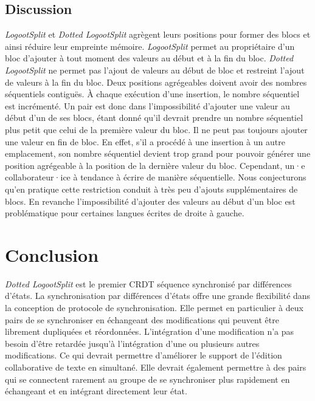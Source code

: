 \vspace*{\fill}
\clearpage

\subsection{Discussion}

\emph{LogootSplit} et \emph{Dotted LogootSplit} agrègent leurs positions pour former des blocs et ainsi réduire leur empreinte mémoire.
\emph{LogootSplit} permet au propriétaire d'un bloc d'ajouter à tout moment des valeurs au début et à la fin du bloc.
\emph{Dotted LogootSplit} ne permet pas l'ajout de valeurs au début de bloc et restreint l'ajout de valeurs à la fin du bloc.
Deux positions agrégeables doivent avoir des nombres séquentiels contiguës.
À chaque exécution d'une insertion, le nombre séquentiel est incrémenté.
Un pair est donc dans l'impossibilité d'ajouter une valeur au début d'un de ses blocs, étant donné qu'il devrait prendre un nombre séquentiel plus petit que celui de la première valeur du bloc.
Il ne peut pas toujours ajouter une valeur en fin de bloc.
En effet, s'il a procédé à une insertion à un autre emplacement, son nombre séquentiel devient trop grand pour pouvoir générer une position agrégeable à la position de la dernière valeur du bloc.
Cependant, un·e collaborateur·ice à tendance à écrire de manière séquentielle.
Nous conjecturons qu'en pratique cette restriction conduit à très peu d'ajouts supplémentaires de blocs.
En revanche l'impossibilité d'ajouter des valeurs au début d'un bloc est problématique pour certaines langues écrites de droite à gauche.

\section{Conclusion}

\emph{Dotted LogootSplit} est le premier \ac{CRDT} séquence synchronisé par différences d'états.
La synchronisation par différences d'états offre une grande flexibilité dans la conception de protocole de synchronisation.
Elle permet en particulier à deux pairs de se synchroniser en échangeant des modifications qui peuvent être librement dupliquées et réordonnées.
L'intégration d'une modification n'a pas besoin d'être retardée jusqu'à l'intégration d'une ou plusieurs autres modifications.
Ce qui devrait permettre d'améliorer le support de l'édition collaborative de texte en simultané.
Elle devrait également permettre à des pairs qui se connectent rarement au groupe de se synchroniser plus rapidement en échangeant et en intégrant directement leur état.

